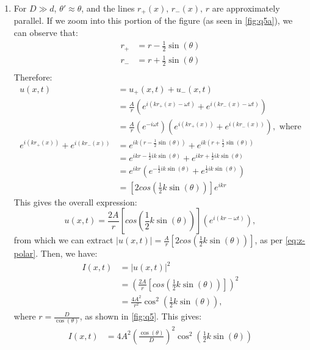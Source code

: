\documentclass[a4paper, titlepage, DIV=14]{scrartcl}
\begin{document}
\begin{enumerate}
        \item For $D\gg d$, $\theta' \approx \theta$, and the lines $r_{+}(x), \, 
        r_{-}(x), \, r$ are approximately parallel. If we zoom into this portion of the
        figure (as seen in \autoref{fig:q5a}), we can observe that:
        \begin{align*}
            r_{+} &= r - \frac{1}{2}\sin(\theta) \\
            r_{-} &= r + \frac{1}{2}\sin(\theta) \\
        \end{align*} 
        Therefore:
        \begin{align*}
            u(x,t) &= u_{+}(x,t) + u_{-}(x,t) \\
            &= \frac{A}{r}(e^{i(kr_{+}(x)-\omega t)} + e^{i(kr_{-}(x)-\omega t)}) \\
            &= \frac{A}{r}(e^{-i\omega t})(e^{i(kr_{+}(x))} + e^{i(kr_{-}(x))}),  \text{ where}\\
            e^{i(kr_{+}(x))} + e^{i(kr_{-}(x))} &= e^{ik(r-\frac{1}{2}\sin(\theta))} 
                    + e^{ik(r+\frac{1}{2}\sin(\theta))} \\
                    &= e^{ikr-\frac{1}{2}ik\sin(\theta)} 
                    + e^{ikr+\frac{1}{2}ik\sin(\theta)} \\
                    &= e^{ikr}(e^{-\frac{1}{2}ik\sin(\theta)}+e^{\frac{1}{2}ik\sin(\theta)}) \\
                    &= [2cos(\frac{1}{2}k\sin(\theta))]e^{ikr}
        \end{align*}
        This gives the overall expression:
        \begin{equation*}
            u(x,t) = \frac{2A}{r}[cos(\frac{1}{2}k\sin(\theta))]
                    (e^{i(kr-\omega t)}),
        \end{equation*}from which we can extract $|u(x,t)|=\frac{A}{r}[2cos(\frac{1}{2}k\sin(\theta))]$, 
        as per \autoref{eq:z-polar}. Then, we have:
        \begin{align*}
            I(x,t) &= |u(x,t)|^{2}\\
                &= (\frac{2A}{r}[cos(\frac{1}{2}k\sin(\theta))])^{2} \\
                &= \frac{4A^{2}}{r^{2}}\cos^{2}(\frac{1}{2}k\sin(\theta)),
        \end{align*} where $r = \frac{D}{\cos(\theta)}$, as shown in \autoref{fig:q5}. This gives:
        \begin{align*}
            I(x,t) &= 4A^{2}(\frac{\cos(\theta)}{D})^{2}\cos^{2}(\frac{1}{2}k\sin(\theta)) \\

\end{align*}
\end{enumerate}
\end{document}

